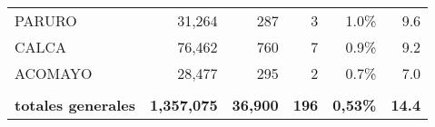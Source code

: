 \begin{tabular}{lrrrrr}
	\cellcolor[HTML]{FFFFC7}PARURO        & 31,264                                                         & 287                                                                             & 3                                                              & 1.0\%                                                                  & 9.6                                                                                                                                \\
	\cellcolor[HTML]{FFFFC7}CALCA         & 76,462                                                         & 760                                                                             & 7                                                              & 0.9\%                                                                  & 9.2                                                                                                                                \\
	\cellcolor[HTML]{FFFFC7}ACOMAYO       & 28,477                                                         & 295                                                                             & 2                                                              & 0.7\%                                                                  & 7.0                                                                                                                                \\
	& \multicolumn{1}{l}{}                                           & \multicolumn{1}{l}{}                                                            & \multicolumn{1}{l}{}                                           & \multicolumn{1}{l}{}                                                   & \multicolumn{1}{l}{}                                                                                                               \\
	\rowcolor[HTML]{ECF4FF} 
	\textbf{totales generales}            & \multicolumn{1}{l}{\cellcolor[HTML]{ECF4FF}\textbf{1,357,075}} & \multicolumn{1}{l}{\cellcolor[HTML]{ECF4FF}\textbf{36,900}}                     & \multicolumn{1}{l}{\cellcolor[HTML]{ECF4FF}\textbf{196}}       & \multicolumn{1}{l}{\cellcolor[HTML]{ECF4FF}\textbf{0,53\%}}            & \multicolumn{1}{l}{\cellcolor[HTML]{ECF4FF}\textbf{14.4}}                                                                         
\end{tabular}